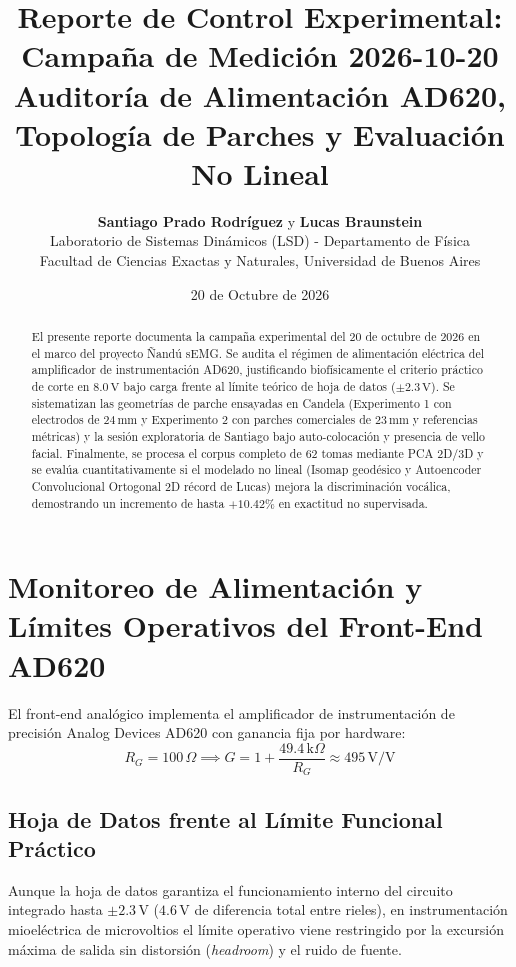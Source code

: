 \documentclass[11pt,a4paper]{article}
\title{
    \vspace{-1.5cm}
    \textbf{\Large Reporte de Control Experimental: Campaña de Medición 2026-10-20}\\[0.4em]
    \large Auditoría de Alimentación AD620, Topología de Parches y Evaluación No Lineal
}
\author{
    \textbf{Santiago Prado Rodríguez} \quad y \quad \textbf{Lucas Braunstein}\\[0.4em]
    \normalsize Laboratorio de Sistemas Dinámicos (LSD) - Departamento de Física\\
    \normalsize Facultad de Ciencias Exactas y Naturales, Universidad de Buenos Aires
}
\date{20 de Octubre de 2026}
\begin{document}
\maketitle

\begin{abstract}
El presente reporte documenta la campaña experimental del 20 de octubre de 2026 en el marco del proyecto Ñandú sEMG. Se audita el régimen de alimentación eléctrica del amplificador de instrumentación AD620, justificando biofísicamente el criterio práctico de corte en $8.0\,\text{V}$ bajo carga frente al límite teórico de hoja de datos ($\pm 2.3\,\text{V}$). Se sistematizan las geometrías de parche ensayadas en Candela (Experimento 1 con electrodos de $24\,\text{mm}$ y Experimento 2 con parches comerciales de $23\,\text{mm}$ y referencias métricas) y la sesión exploratoria de Santiago bajo auto-colocación y presencia de vello facial. Finalmente, se procesa el corpus completo de 62 tomas mediante PCA 2D/3D y se evalúa cuantitativamente si el modelado no lineal (Isomap geodésico y Autoencoder Convolucional Ortogonal 2D récord de Lucas) mejora la discriminación vocálica, demostrando un incremento de hasta $+10.42\%$ en exactitud no supervisada.
\end{abstract}

\section{Monitoreo de Alimentación y Límites Operativos del Front-End AD620}

El front-end analógico implementa el amplificador de instrumentación de precisión Analog Devices AD620 con ganancia fija por hardware:
\begin{equation}
    R_G = 100\,\Omega \implies G = 1 + \frac{49.4\,\text{k}\Omega}{R_G} \approx 495\,\text{V/V}
\end{equation}

\subsection{Hoja de Datos frente al Límite Funcional Práctico}
Aunque la hoja de datos garantiza el funcionamiento interno del circuito integrado hasta $\pm 2.3\,\text{V}$ ($4.6\,\text{V}$ de diferencia total entre rieles), en instrumentación mioeléctrica de microvoltios el límite operativo viene restringido por la excursión máxima de salida sin distorsión (\textit{headroom}) y el ruido de fuente.
\end{document}
